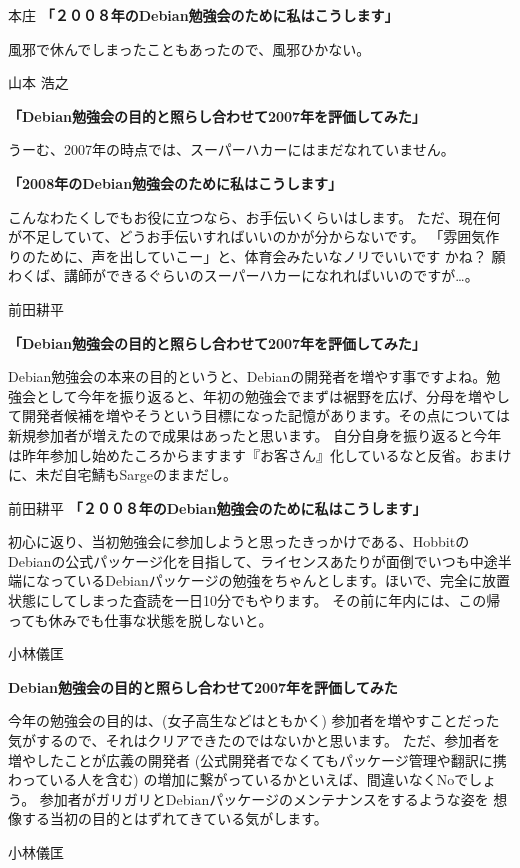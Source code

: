 \documentclass[cjk,dvipdfmx,12pt]{beamer}
\begin{document}
\begin{frame}{本庄}
\textbf{「２００８年のDebian勉強会のために私はこうします」}

風邪で休んでしまったこともあったので、風邪ひかない。

\end{frame}\begin{frame}{山本 浩之}

\textbf{「Debian勉強会の目的と照らし合わせて2007年を評価してみた」}

うーむ、2007年の時点では、スーパーハカーにはまだなれていません。

\textbf{「2008年のDebian勉強会のために私はこうします」}

こんなわたくしでもお役に立つなら、お手伝いくらいはします。
ただ、現在何が不足していて、どうお手伝いすればいいのかが分からないです。
「雰囲気作りのために、声を出していこー」と、体育会みたいなノリでいいです
かね？
願わくば、講師ができるぐらいのスーパーハカーになれればいいのですが…。

\end{frame}\begin{frame}{前田耕平}

\textbf{「Debian勉強会の目的と照らし合わせて2007年を評価してみた」}

Debian勉強会の本来の目的というと、Debianの開発者を増やす事ですよね。勉強会として今年を振り返ると、年初の勉強会でまずは裾野を広げ、分母を増やして開発者候補を増やそうという目標になった記憶があります。その点については新規参加者が増えたので成果はあったと思います。
自分自身を振り返ると今年は昨年参加し始めたころからますます『お客さん』化しているなと反省。おまけに、未だ自宅鯖もSargeのままだし。

\end{frame}\begin{frame}{前田耕平}
\textbf{「２００８年のDebian勉強会のために私はこうします」}

初心に返り、当初勉強会に参加しようと思ったきっかけである、HobbitのDebianの公式パッケージ化を目指して、ライセンスあたりが面倒でいつも中途半端になっているDebianパッケージの勉強をちゃんとします。ほいで、完全に放置状態にしてしまった査読を一日10分でもやります。
その前に年内には、この帰っても休みでも仕事な状態を脱しないと。

\end{frame}\begin{frame}{小林儀匡}

\textbf{ Debian勉強会の目的と照らし合わせて2007年を評価してみた}

今年の勉強会の目的は、(女子高生などはともかく) 参加者を増やすことだった気がするので、それはクリアできたのではないかと思います。
ただ、参加者を増やしたことが広義の開発者 (公式開発者でなくてもパッケージ管理や翻訳に携わっている人を含む) の増加に繋がっているかといえば、間違いなくNoでしょう。
参加者がガリガリとDebianパッケージのメンテナンスをするような姿を
想像する当初の目的とはずれてきている気がします。
\end{frame}\begin{frame}{小林儀匡}


\end{frame}
\end{document}
